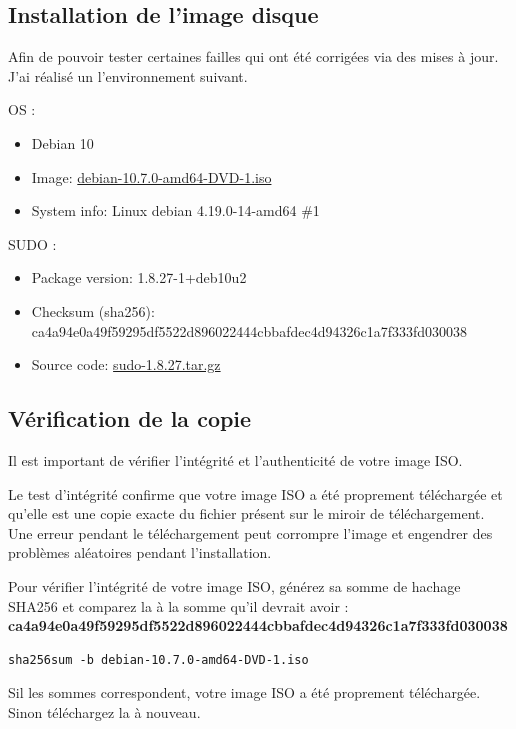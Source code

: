 \documentclass[12pt,a4paper]{article}
\begin{document}
    \subsection{Installation de l'image disque}
    \begin{flushleft}
       \noindent Afin de pouvoir tester certaines failles qui ont été corrigées via des mises à jour. J'ai réalisé un l'environnement suivant. 
       \item OS : 
       \begin{itemize}
           \item  Debian 10
           \item Image: \href{https://cdimage.debian.org/mirror/cdimage/archive/10.7.0/amd64/iso-dvd/debian-10.7.0-amd64-DVD-1.iso}{debian-10.7.0-amd64-DVD-1.iso } \cite{CVE2021350:online}
           \item System info: Linux debian 4.19.0-14-amd64 \#1
       \end{itemize}
       \item SUDO : 
       \begin{itemize}
           \item Package version: 1.8.27-1+deb10u2
           \item Checksum (sha256): ca4a94e0a49f59295df5522d896022444cbbafdec4d94326c1a7f333fd030038
           \item Source code: \href{https://www.sudo.ws/dist/sudo-1.8.27.tar.gz}{sudo-1.8.27.tar.gz} \cite{CVE2021350:online}
       \end{itemize}

       \subsection{Vérification de la copie}
       \item Il est important de vérifier l’intégrité et l’authenticité de votre image ISO.
       \item Le test d’intégrité confirme que votre image ISO a été proprement téléchargée et qu’elle est une copie exacte du fichier présent sur le miroir de téléchargement. Une erreur pendant le téléchargement peut corrompre l’image et engendrer des problèmes aléatoires pendant l’installation.
       \item Pour vérifier l’intégrité de votre image ISO, générez sa somme de hachage SHA256 et comparez la à la somme qu'il devrait avoir : \textbf{ca4a94e0a49f59295df5522d896022444cbbafdec4d94326c1a7f333fd030038}
        \begin{lstlisting}
sha256sum -b debian-10.7.0-amd64-DVD-1.iso
        \end{lstlisting}
        \item Sil les sommes correspondent, votre image ISO a été proprement téléchargée. Sinon téléchargez la à nouveau. 
       

\end{flushleft}
\end{document}
